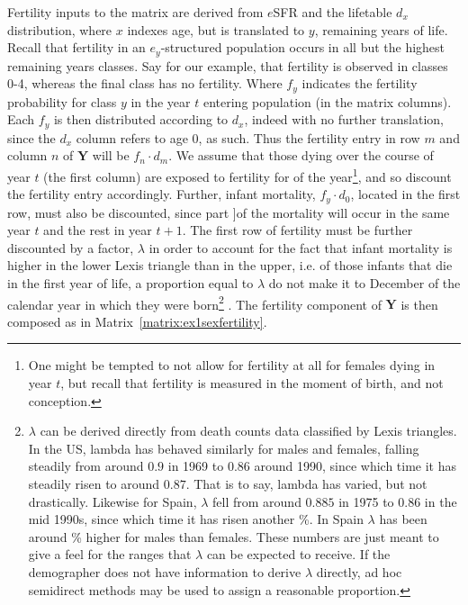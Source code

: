  Fertility inputs to the matrix are derived from $e$SFR and the lifetable $d_x$
 distribution, where $x$ indexes age, but is translated to $y$, remaining years
 of life. Recall that fertility in an $e_y$-structured population occurs in all
 but the highest remaining years classes. Say for our example, that fertility is
 observed in classes 0-4, whereas the final class has no fertility. Where $f_y$
 indicates the fertility probability for class $y$ in the year $t$ entering
 population (in the matrix columns). Each $f_y$ is then distributed according to
 $d_x$, indeed with no further translation, since the $d_x$ column refers to age
 0, as such. Thus the fertility entry in row $m$ and column $n$ of $\textbf{Y}$
 will be $f_n \cdot d_m$. We assume that those dying over the course of year
 $t$ (the first column) are exposed to fertility for \textonehalf of the
 year\footnote{One might be tempted to not allow for fertility at all for
 females dying in year $t$, but recall that fertility is measured in the moment of
 birth, and not conception.},
 and so discount the fertility entry accordingly. Further, infant mortality, 
 $f_y \cdot d_0$, located in the first row, must also be discounted, since part
 ]of the mortality will occur in the same year $t$ and the rest in year $t+1$. 
 The first row of fertility must be further discounted by a factor, $\lambda$ in 
 order to account for the fact that infant mortality is higher in the lower Lexis 
 triangle than in the upper, i.e.
 of those infants that die in the first year of life, a proportion equal to
 $\lambda$ do not make it to December  of the calendar year in which
 they were born\footnote{$\lambda$ can be derived directly from death counts
 data classified by Lexis triangles. In the US, lambda has behaved similarly
 for males and females, falling steadily from around $0.9$ in 1969 to $0.86$
 around 1990, since which time it has steadily risen to around $0.87$. That is
 to say, lambda has varied, but not drastically. Likewise for Spain, $\lambda$
 fell from around $0.885$ in 1975 to $0.86$ in the mid 1990s, since which time it
 has risen another \textonehalf\%. In Spain  $\lambda$ has been around \textonehalf\%
 higher for males than females. These numbers are just meant to give a feel
 for the ranges that $\lambda$ can be expected to receive. If the demographer
 does not have information to derive $\lambda$ directly, ad hoc semidirect
 methods may be used to assign a reasonable proportion. } . The
 fertility component of $\textbf{Y}$ is then composed as in Matrix~\ref{matrix:ex1sexfertility}.

